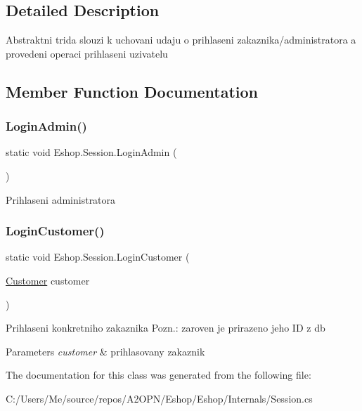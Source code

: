 \subsection{Detailed Description}
Abstraktni trida slouzi k uchovani udaju o prihlaseni zakaznika/administratora a provedeni operaci prihlaseni uzivatelu 



\subsection{Member Function Documentation}
\mbox{\label{class_eshop_1_1_session_a9808d695ce5e2fbfbaf730b37334ac8b}} 
\subsubsection{\texorpdfstring{LoginAdmin()}{LoginAdmin()}}
{\footnotesize\ttfamily static void Eshop.\+Session.\+Login\+Admin (\begin{DoxyParamCaption}{ }\end{DoxyParamCaption})\hspace{0.3cm}{\ttfamily [static]}}



Prihlaseni administratora 

\mbox{\label{class_eshop_1_1_session_a2843d0754878d156e50ebd96e93ca1c3}} 
\subsubsection{\texorpdfstring{LoginCustomer()}{LoginCustomer()}}
{\footnotesize\ttfamily static void Eshop.\+Session.\+Login\+Customer (\begin{DoxyParamCaption}\item[{\mbox{\hyperlink{class_eshop_1_1_customer}{Customer}}}]{customer }\end{DoxyParamCaption})\hspace{0.3cm}{\ttfamily [static]}}



Prihlaseni konkretniho zakaznika Pozn.\+: zaroven je prirazeno jeho ID z db 


\begin{DoxyParams}{Parameters}
{\em customer} & prihlasovany zakaznik\\
\hline
\end{DoxyParams}


The documentation for this class was generated from the following file\+:\begin{DoxyCompactItemize}
\item 
C\+:/\+Users/\+Me/source/repos/\+A2\+O\+P\+N/\+Eshop/\+Eshop/\+Internals/Session.\+cs\end{DoxyCompactItemize}
